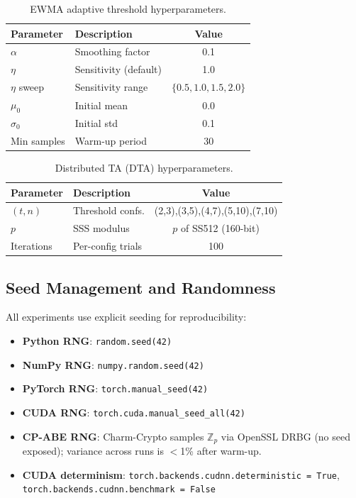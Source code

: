 \documentclass[lettersize,journal]{IEEEtran}
\begin{document}
\begin{table}[t]
\centering
\caption{EWMA adaptive threshold hyperparameters.}
\label{tab:repro_ewma}
\begin{tabular}{llc}
\toprule
\textbf{Parameter} & \textbf{Description} & \textbf{Value} \\
\midrule
$\alpha$ & Smoothing factor & 0.1 \\
$\eta$ & Sensitivity (default) & 1.0 \\
$\eta$ sweep & Sensitivity range & $\{0.5, 1.0, 1.5, 2.0\}$ \\
$\mu_0$ & Initial mean & 0.0 \\
$\sigma_0$ & Initial std & 0.1 \\
Min samples & Warm-up period & 30 \\
\bottomrule
\end{tabular}
\end{table}

\begin{table}[t]
\centering
\caption{Distributed TA (DTA) hyperparameters.}
\label{tab:repro_dta}
\begin{tabular}{llc}
\toprule
\textbf{Parameter} & \textbf{Description} & \textbf{Value} \\
\midrule
$(t,n)$ & Threshold confs. & (2,3),(3,5),(4,7),(5,10),(7,10) \\
$p$ & SSS modulus & $p$ of SS512 (160-bit) \\
Iterations & Per-config trials & 100 \\
\bottomrule
\end{tabular}
\end{table}

\subsection{Seed Management and Randomness}

All experiments use explicit seeding for reproducibility:

\begin{itemize}
    \item \textbf{Python RNG}: \verb|random.seed(42)|
    \item \textbf{NumPy RNG}: \verb|numpy.random.seed(42)|
    \item \textbf{PyTorch RNG}: \verb|torch.manual_seed(42)|
    \item \textbf{CUDA RNG}: \verb|torch.cuda.manual_seed_all(42)|
    \item \textbf{CP-ABE RNG}: Charm-Crypto samples $\mathbb{Z}_p$
    via OpenSSL DRBG (no seed exposed); variance across runs is $<$1\%
    after warm-up.
    \item \textbf{CUDA determinism}: \verb|torch.backends.cudnn.deterministic = True|,
    \verb|torch.backends.cudnn.benchmark = False|
\end{itemize}
\end{document}
